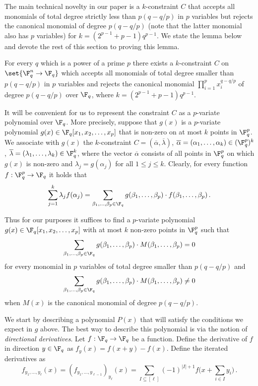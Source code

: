 The main technical novelty in our paper is a $k$-constraint $C$ 
that accepts all monomials of total degree strictly less than
$p(q-q/p)$ in $p$ variables but rejects the canonical monomial of degree $p(q-q/p)$
(note that the latter monomial also has $p$ variables) for
$k= (2^{p-1}+p-1)q^{p-1}$. We state the lemma below and devote the
rest of this section to proving this lemma.

\begin{lemma}\label{lem:main-technical}
For every $q$ which is a power of a prime $p$ there exists a
$k$-constraint $C$ on $\set{\F_q^n \to \F_q}$ which accepts all monomials of total degree smaller than $p(q-q/p)$ in $p$
variables and rejects the canonical monomial $\prod_{i=1}^{p} x_i^{q-q/p}$
of degree $p(q-q/p)$  over $\F_q$, where $k = (2^{p-1}+p-1)q^{p-1}$.
\end{lemma}


It will be convenient for us to represent the constraint $C$ as a $p$-variate polynomial over $\F_q$. More precisely, suppose that
 $g(x)$ is a $p$-variate polynomial $g(x) \in \F_q [x_1,x_2,\ldots,x_p]$ that is non-zero on at most $k$ points in $\F_q^p$.
We associate with $g(x)$ the $k$-constraint $C=(\overline \alpha, \overline \lambda)$,
$\overline \alpha = (\alpha_1,\ldots,\alpha_k) \in (\F_q^p)^k$,  $\overline \lambda = (\lambda_1,\ldots,\lambda_k) \in \F_q^k$, where the vector $\overline \alpha$ consists
of all points  in $\F_q^p$ on which $g(x)$ is non-zero and $\lambda_j = g(\alpha_j)$ for all $ 1 \leq j \leq k$. Clearly, for every function
$f: \F_q^p \to \F_q$ it holds that
\begin{equation*}
\sum_{j=1}^k \lambda_j f(\alpha_j) = \sum_{\beta_1, \ldots, \beta_p \in \F_q} g(\beta_1, \ldots, \beta_p) \cdot f(\beta_1, \ldots, \beta_p)\,.
\end{equation*}

Thus for our purposes it suffices to find
%
%
a $p$-variate polynomial  $g(x) \in \F_{q} [x_1,x_2,\ldots,x_p]$
 with at most $k$ non-zero points in $\F_q^p$ such that $$ \sum_{\beta_1,\ldots,\beta_p \in \F_q} g(\beta_1,\ldots,\beta_p) \cdot M(\beta_1,\ldots,\beta_p) = 0$$ for
 every monomial in $p$ variables of total degree smaller than $p(q-q/p)$ and
 $$ \sum_{\beta_1,\ldots,\beta_p \in \F_q} g(\beta_1,\ldots,\beta_p) \cdot M(\beta_1,\ldots,\beta_p) \neq 0$$ when $M(x)$ is the canonical monomial of degree $p(q-q/p)$.

We start by describing a polynomial $P(x)$ that will satisfy the conditions we expect in $g$ above. The best way to describe this polynomial is via the notion of \emph{directional derivatives}. Let $f: \F_q \to \F_q$ be a function. Define the
derivative of $f$ in direction $y \in \F_q$ as $f_y(x) = f(x+y) - f(x)$.
Define the iterated derivatives as
\[f_{y_1,\ldots,y_\ell}(x) = (f_{y_1,\ldots,y_{\ell-1}})_{y_\ell}(x) = \sum_{I \subseteq [\ell]} (-1)^{|I|+1} f\bigg(x + \sum_{i \in I}y_i\bigg) \,.\]

